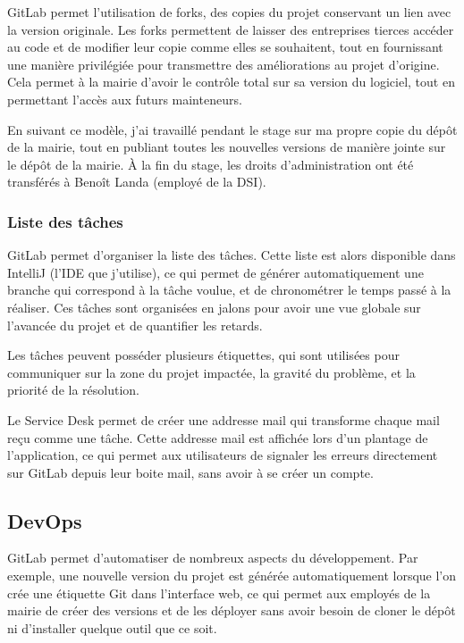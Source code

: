 GitLab permet l'utilisation de forks, des copies du projet conservant un lien avec la version originale.
Les forks permettent de laisser des entreprises tierces accéder au code et de modifier leur copie comme elles se souhaitent, tout en fournissant une manière privilégiée pour transmettre des améliorations au projet d'origine.
Cela permet à la mairie d'avoir le contrôle total sur sa version du logiciel, tout en permettant l'accès aux futurs mainteneurs.

En suivant ce modèle, j'ai travaillé pendant le stage sur ma propre copie du dépôt de la mairie, tout en publiant toutes les nouvelles versions de manière jointe sur le dépôt de la mairie.
À la fin du stage, les droits d'administration ont été transférés à Benoît Landa (employé de la DSI).

\subsubsection{Liste des tâches}

GitLab permet d'organiser la liste des tâches.
Cette liste est alors disponible dans IntelliJ (l'IDE que j'utilise), ce qui permet de générer automatiquement une branche qui correspond à la tâche voulue, et de chronométrer le temps passé à la réaliser.
Ces tâches sont organisées en jalons pour avoir une vue globale sur l'avancée du projet et de quantifier les retards.

Les tâches peuvent posséder plusieurs étiquettes, qui sont utilisées pour communiquer sur la zone du projet impactée, la gravité du problème, et la priorité de la résolution.

Le Service Desk permet de créer une addresse mail qui transforme chaque mail reçu comme une tâche.
Cette addresse mail est affichée lors d'un plantage de l'application, ce qui permet aux utilisateurs de signaler les erreurs directement sur GitLab depuis leur boite mail, sans avoir à se créer un compte.

\subsection{DevOps}\label{subsec:devops}

GitLab permet d'automatiser de nombreux aspects du développement.
Par exemple, une nouvelle version du projet est générée automatiquement lorsque l'on crée une étiquette Git dans l'interface web, ce qui permet aux employés de la mairie de créer des versions et de les déployer sans avoir besoin de cloner le dépôt ni d'installer quelque outil que ce soit.

